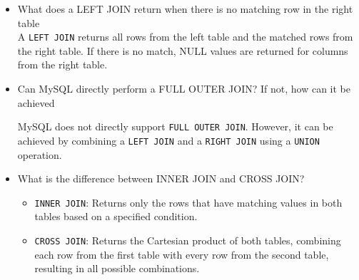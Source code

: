 \documentclass[12pt,a4paper]{article}
\begin{document}
\begin{itemize}
\item What does a LEFT JOIN return when there is no matching row in the right table \\
A \texttt{LEFT JOIN} returns all rows from the left table and the matched rows from the right table. If there is no match, NULL values are returned for columns from the right table.

\item Can MySQL directly perform a FULL OUTER JOIN\@? If not, how can it be achieved

MySQL does not directly support \texttt{FULL OUTER JOIN}. However, it can be achieved by combining a \texttt{LEFT JOIN} and a \texttt{RIGHT JOIN} using a \texttt{UNION} operation.

\item What is the difference between INNER JOIN and CROSS JOIN\@?
\begin{itemize}
    \item \texttt{INNER JOIN}: Returns only the rows that have matching values in both tables based on a specified condition.
    \item \texttt{CROSS JOIN}: Returns the Cartesian product of both tables, combining each row from the first table with every row from the second table, resulting in all possible combinations. 
\end{itemize}
\end{itemize}
\end{document}
